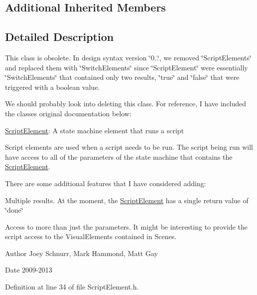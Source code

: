 \subsection*{Additional Inherited Members}


\subsection{Detailed Description}
This class is obsolete. In design syntax version \char`\"{}0..\char`\"{}, we removed \char`\"{}\-Script\-Elements\char`\"{} and replaced them with \char`\"{}\-Switch\-Elements\char`\"{} since \char`\"{}\-Script\-Element\char`\"{} were essentially \char`\"{}\-Switch\-Elements\char`\"{} that contained only two results, \char`\"{}true\char`\"{} and \char`\"{}false\char`\"{} that were triggered with a boolean value. 

We should probably look into deleting this class. For reference, I have included the classes original documentation below\-:

\hyperlink{class_picto_1_1_script_element}{Script\-Element}\-: A state machine element that runs a script

Script elements are used when a script needs to be run. The script being run will have access to all of the parameters of the state machine that contains the \hyperlink{class_picto_1_1_script_element}{Script\-Element}.

There are some additional features that I have considered adding\-:
\begin{DoxyEnumerate}
\item Multiple results. At the moment, the \hyperlink{class_picto_1_1_script_element}{Script\-Element} has a single return value of \char`\"{}done\char`\"{}
\item Access to more than just the parameters. It might be interesting to provide the script access to the Visual\-Elements contained in Scenes. \begin{DoxyAuthor}{Author}
Joey Schnurr, Mark Hammond, Matt Gay 
\end{DoxyAuthor}
\begin{DoxyDate}{Date}
2009-\/2013 
\end{DoxyDate}

\end{DoxyEnumerate}

Definition at line 34 of file Script\-Element.\-h.



